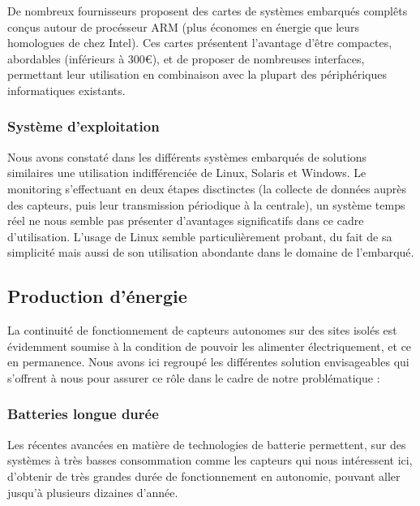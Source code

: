 De nombreux fournisseurs proposent des cartes de systèmes embarqués complêts conçus autour de procésseur ARM (plus économes en énergie que leurs homologues de chez Intel). Ces cartes présentent l'avantage d'être compactes, abordables (inférieurs à 300\euro ), et de proposer de nombreuses interfaces, permettant leur utilisation en combinaison avec la plupart des périphériques informatiques existants.

\subsubsection{Système d'exploitation}

Nous avons constaté dans les différents systèmes embarqués de solutions similaires une utilisation indifférenciée de Linux, Solaris et Windows\footnotemark. Le monitoring s'effectuant en deux étapes disctinctes (la collecte de données auprès des capteurs, puis leur transmission périodique à la centrale), un système temps réel ne nous semble pas présenter d'avantages significatifs dans ce cadre d'utilisation. L'usage de Linux semble particulièrement probant, du fait de sa simplicité mais aussi de son utilisation abondante dans le domaine de l'embarqué.



\subsection{Production d'énergie}

La continuité de fonctionnement de capteurs autonomes sur des sites isolés est évidemment soumise à la condition de pouvoir les alimenter électriquement, et ce en permanence. Nous avons ici regroupé les différentes solution envisageables qui s’offrent à nous pour assurer ce rôle dans le cadre de notre problématique :

\subsubsection{Batteries longue durée}

Les récentes avancées en matière de technologies de batterie permettent, sur des systèmes à très basses consommation comme les capteurs qui nous intéressent ici, d’obtenir de très grandes durée de fonctionnement en autonomie, pouvant aller jusqu’à plusieurs dizaines d’année.

